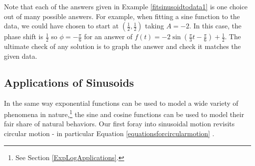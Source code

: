 \documentclass{ximera}
\begin{document}
\begin{example}
\begin{explanation}
\begin{enumerate}
\begin{image}
\end{image}

\end{enumerate}
\end{explanation}
\end{example}

Note that each of the answers given in Example \ref{fitsinusoidtodata1} is one choice out of many possible answers.  For example, when fitting a sine function to the data, we could have chosen to start at $\left(\frac{1}{2}, \frac{1}{2}\right)$ taking $A = -2$.  In this case, the phase shift is $\frac{1}{2}$ so  $\phi = -\frac{\pi}{6}$ for an answer of $f(t) = -2 \sin\left(\frac{\pi}{3} t - \frac{\pi}{6}\right) + \frac{1}{2}$.  The ultimate check of any solution is to graph the answer and check it matches the given data.


\subsection{Applications of Sinusoids}
\label{Sinusoid}

In the same way exponential functions can be used to model a wide variety of phenomena in nature,\footnote{See Section \ref{ExpLogApplications}.} the sine and cosine functions can be used to model their fair share of natural behaviors. Our first foray into sinusoidal motion revisits circular motion - in particular Equation \ref{equationsforcircularmotion} . 
\end{document}
